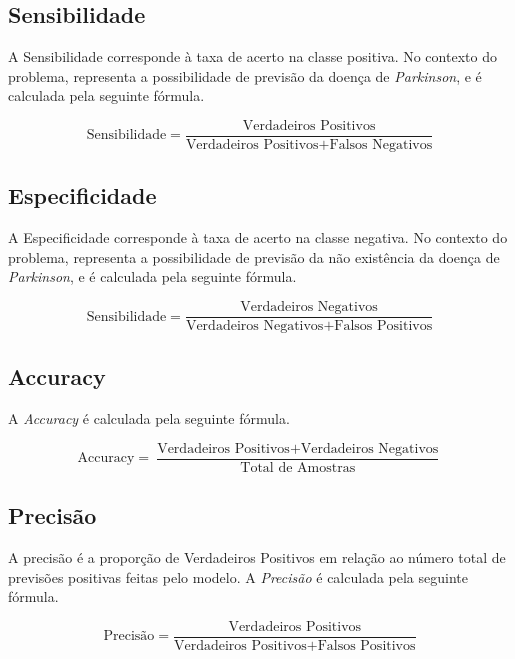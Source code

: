 \documentclass[12pt,a4paper,twoside]{report}
\begin{document}
{\subsection{Sensibilidade}

A Sensibilidade corresponde à taxa de acerto na classe positiva. No contexto do problema, representa a possibilidade de previsão da doença de \textit{Parkinson}, e é calculada pela seguinte fórmula.

\begin{equation}
\text{Sensibilidade} = \frac{\text{Verdadeiros Positivos}}{\text{Verdadeiros Positivos} + \text{Falsos Negativos}}
\end{equation}

\subsection{Especificidade}

A Especificidade corresponde à taxa de acerto na classe negativa. No contexto do problema, representa a possibilidade de previsão da não existência da doença de \textit{Parkinson}, e é calculada pela seguinte fórmula.

\begin{equation}
\text{Sensibilidade} = \frac{\text{Verdadeiros Negativos}}{\text{Verdadeiros Negativos} + \text{Falsos Positivos}}
\end{equation}

\subsection{Accuracy}

A \textit{Accuracy} é calculada pela seguinte fórmula.

\begin{equation}
\text{Accuracy} = \frac{\text{Verdadeiros Positivos} + \text{Verdadeiros Negativos}}{\text{Total de Amostras}}
\end{equation}

\subsection{Precisão}

A precisão é a proporção de Verdadeiros Positivos em relação ao número
total de previsões positivas feitas pelo modelo. A \textit{Precisão} é calculada pela seguinte fórmula.

\begin{equation}
\text{Precisão} = \frac{\text{Verdadeiros Positivos}}{\text{Verdadeiros Positivos} + \text{Falsos Positivos}}
\end{equation}

}
\end{document}
